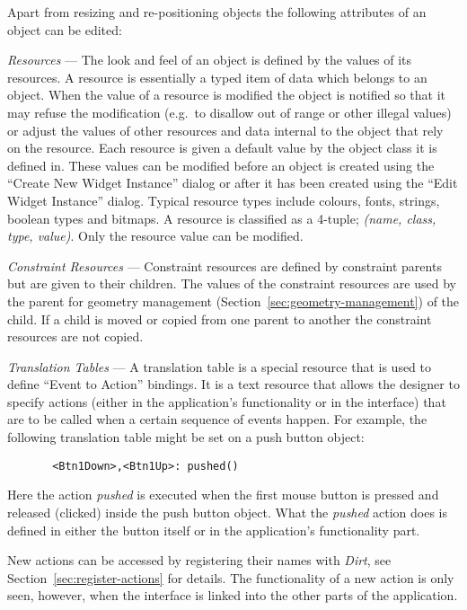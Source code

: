 Apart from resizing and re-positioning objects the following attributes of
an object can be edited:\begin{description}
\item{\em Resources} --- The look and feel of an object is defined by the
values of its resources.  A resource is essentially a typed item of data
which belongs to an object.  When the value of a resource is modified the
object is notified so that it may refuse the modification (e.g.\ to disallow
out of range or other illegal values) or adjust the values of other resources
and data internal to the object that rely on the resource.
Each resource is given a default value by the
object class it is defined in.  These values can be modified before an object
is created using the ``Create New Widget Instance'' dialog or after it has
been created using the ``Edit Widget Instance'' dialog.  Typical resource
types include colours, fonts, strings, boolean types and bitmaps.  A resource
is classified as a 4-tuple; {\em (name, class, type, value)}.  Only the
resource value can be modified.
\item{\em Constraint Resources} --- Constraint resources are defined by
constraint parents but are given to their children. The values of the
constraint resources are used by the parent for geometry management
(Section~\ref{sec:geometry-management}) of the child. If a child is moved or
copied from one parent to another the constraint resources are not copied.
\item{\em Translation Tables} --- A translation table is a special resource
that is used to define ``Event to Action'' bindings. It is a text resource
that allows the designer to specify actions (either in the application's
functionality or in the interface) that are to be called when a certain
sequence of events happen. For example, the following translation table
might be set on a push button object:\begin{verbatim}
       <Btn1Down>,<Btn1Up>: pushed()
\end{verbatim}
Here the action {\em pushed} is executed when the first mouse button is
pressed and released (clicked) inside the push button object.  What the {\em
pushed} action does is defined in either the button itself or in the
application's functionality part.

New actions can be accessed by registering their names with {\em Dirt}, see
Section~\ref{sec:register-actions} for details.  The functionality of a new
action is only seen, however, when the interface is linked into the other
parts of the application.


\end{description}
